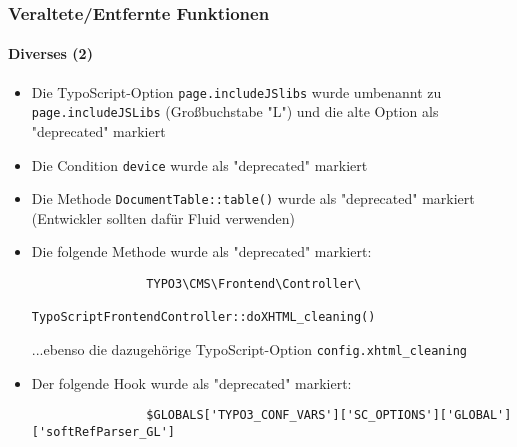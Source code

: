 \begin{frame}[fragile]
	\frametitle{Veraltete/Entfernte Funktionen}
	\framesubtitle{Diverses (2)}

	\begin{itemize}
		\item Die TypoScript-Option \texttt{page.includeJSlibs} wurde umbenannt zu\newline
			\texttt{page.includeJSLibs} (Großbuchstabe "L") und die alte Option als
			"deprecated" markiert

		\item Die Condition \texttt{device} wurde als "deprecated" markiert

		\item Die Methode \texttt{DocumentTable::table()} wurde als "deprecated" markiert
			(Entwickler sollten dafür Fluid verwenden)

		\item Die folgende Methode wurde als "deprecated" markiert:
			\begin{lstlisting}
				TYPO3\CMS\Frontend\Controller\
				    TypoScriptFrontendController::doXHTML_cleaning()
			\end{lstlisting}
			...ebenso die dazugehörige TypoScript-Option
			\small
				\texttt{config.xhtml\_cleaning}
			\normalsize

		\item Der folgende Hook wurde als "deprecated" markiert:
			\begin{lstlisting}
				$GLOBALS['TYPO3_CONF_VARS']['SC_OPTIONS']['GLOBAL']['softRefParser_GL']
			\end{lstlisting}

	\end{itemize}

\end{frame}


